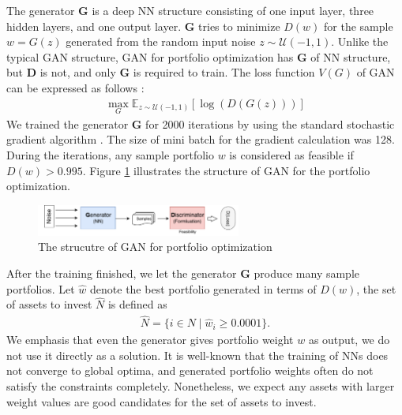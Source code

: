 \documentclass[11pt]{article}
\begin{document}
The generator \textbf{G} is a deep NN structure consisting of one input layer, three hidden layers, and one output layer. \textbf{G} tries to minimize $D(w)$ for the sample $w=G(z)$ generated from the random input noise $z \sim \mathcal {U}(-1,1)$. 
Unlike the typical GAN structure, GAN for portfolio optimization has \textbf{G} of NN structure, but \textbf{D} is not, and only \textbf{G} is required to train. The loss function $V(G)$ of GAN can be expressed as follows :
\begin{align*}
 \max_G \mathbb{E}_{z \sim \mathcal {U}(-1,1)}\left[\log(D(G(z)))\right] 
\end{align*}
We trained the generator \textbf{G} for 2000 iterations by using the standard stochastic gradient algorithm \citep{bottou2010large}. The size of mini batch for the gradient calculation was 128. During the iterations, any sample portfolio $w$ is considered as feasible if $D(w) > 0.995$. Figure \ref{fig:GAN-port} illustrates the structure of GAN for the portfolio optimization. 
\begin{figure}[] 
	\begin{center}
		\includegraphics[width=0.6\textwidth]{GAN_port}
		\caption{The strucutre of GAN for portfolio optimization} \label{fig:GAN-port}
	\end{center}
\end{figure}

After the training finished, we let the generator \textbf{G} produce many sample portfolios. Let $\hat{w}$ denote the best portfolio generated in terms of $D(w)$, the set of assets to invest $\hat{N}$ is defined as
\begin{align}
\hat{N} = \{ i \in N \mid \hat{w}_i \ge 0.0001 \}.
\end{align}
We emphasis that even the generator gives portfolio weight $w$ as output, we do not use it directly as a solution. It is well-known that the training of NNs does not converge to global optima, and generated portfolio weights often do not satisfy the constraints completely. Nonetheless, we expect any assets with larger weight values are good candidates for the set of assets to invest. 
\end{document}
